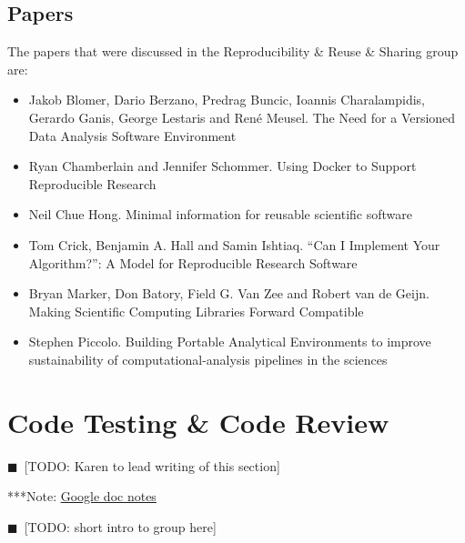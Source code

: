 \documentclass[11pt, oneside]{amsart}
\newcommand{\todo}[1]{{\color{blue}$\blacksquare$~\textsf{[TODO: #1]}}}
\newcommand{\note}[1]{ {\textcolor{blueish}    { ***Note:      #1 }}}
\begin{document}
\subsection{Papers}
The papers that were discussed in the Reproducibility \& Reuse \& Sharing group are:
\begin{itemize}
\item Jakob Blomer, Dario Berzano, Predrag Buncic, Ioannis Charalampidis,
Gerardo Ganis, George Lestaris and Ren\'{e} Meusel. The Need for a Versioned
Data Analysis Software Environment~\cite{wssspe2_blomer}

\item Ryan Chamberlain and Jennifer Schommer. Using {Docker} to Support
Reproducible Research~\cite{wssspe2_chamberlain}

\item Neil Chue Hong. Minimal information for reusable scientific
software~\cite{wssspe2_chue_hong}

\item Tom Crick, Benjamin A. Hall and Samin Ishtiaq. ``Can I Implement Your
Algorithm?'': A Model for Reproducible Research Software~\cite{wssspe2_crick}

\item Bryan Marker, Don Batory, Field G. Van Zee and Robert van de Geijn. Making
Scientific Computing Libraries Forward Compatible~\cite{wssspe2_marker}

\item Stephen Piccolo. Building Portable Analytical Environments to improve
sustainability of computational-analysis pipelines in the
sciences~\cite{wssspe2_piccolo}
\end{itemize}

\section{Code Testing \& Code Review} \label{sec:code_testing}
\todo{Karen to lead writing of this section}

\note{\href{http://tinyurl.com/l5t5h45}{Google doc notes}}

\todo{short intro to group here}
\end{document}
